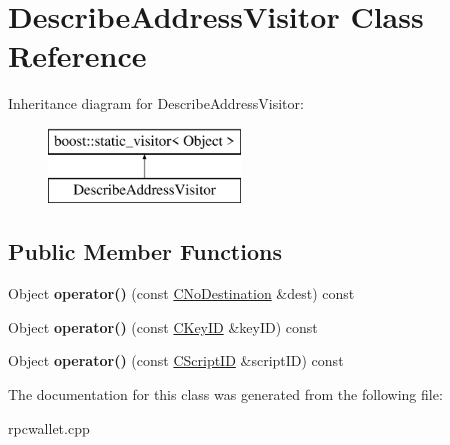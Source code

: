 \hypertarget{class_describe_address_visitor}{}\section{Describe\+Address\+Visitor Class Reference}
\label{class_describe_address_visitor}
Inheritance diagram for Describe\+Address\+Visitor\+:\begin{figure}[H]
\begin{center}
\leavevmode
\includegraphics[height=2.000000cm]{class_describe_address_visitor}
\end{center}
\end{figure}
\subsection*{Public Member Functions}
\begin{DoxyCompactItemize}
\item 
\mbox{\label{class_describe_address_visitor_a515b3873ae09b7b72a3cec56fc91f456}} 
Object {\bfseries operator()} (const \mbox{\hyperlink{class_c_no_destination}{C\+No\+Destination}} \&dest) const
\item 
\mbox{\label{class_describe_address_visitor_aef0a5eb1005e1b071a0cdfc950003412}} 
Object {\bfseries operator()} (const \mbox{\hyperlink{class_c_key_i_d}{C\+Key\+ID}} \&key\+ID) const
\item 
\mbox{\label{class_describe_address_visitor_a3f89bd5b6f24606cff72cb817a8c11a3}} 
Object {\bfseries operator()} (const \mbox{\hyperlink{class_c_script_i_d}{C\+Script\+ID}} \&script\+ID) const
\end{DoxyCompactItemize}


The documentation for this class was generated from the following file\+:\begin{DoxyCompactItemize}
\item 
rpcwallet.\+cpp\end{DoxyCompactItemize}
